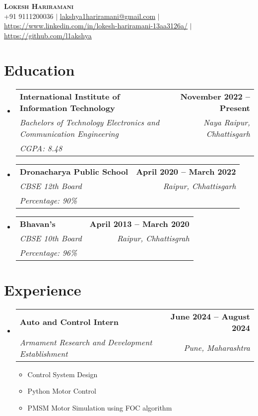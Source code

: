 \documentclass[letterpaper,11pt]{article}
\makeatletter
\newcommand{\resumeItem}[1]{
  \item\small{
    {#1 \vspace{-2pt}}
  }
}
\newcommand{\resumeEducation}[5]{
  \vspace{-2pt}\item
    \begin{tabular*}{\textwidth}{l@{\extracolsep{\fill}}r}
      \textbf{#1} & \textbf{#4} \\
      \textit{\small#3} & \textit{#2} \\
      \textit{#5} & \\
    \end{tabular*}\vspace{-7pt}
}
\newcommand{\resumeSubheading}[4]{
  \vspace{-2pt}\item
    \begin{tabular*}{\textwidth}{l@{\extracolsep{\fill}}r}
      \textbf{#1} & \textbf{#2} \\
      \textit{\small#3} & \textit{#4} \\
    \end{tabular*}\vspace{-7pt}
}
\newcommand{\resumeSubHeadingListStart}{\begin{itemize}[leftmargin=0.15in, label={}]}
\newcommand{\resumeSubHeadingListEnd}{\end{itemize}}
\newcommand{\resumeItemListStart}{\begin{itemize}}
\newcommand{\resumeItemListEnd}{\end{itemize}\vspace{-5pt}}
\makeatother
\begin{document}

\begin{center}
    \textbf{\Huge \scshape Lokesh Hariramani} \\ \vspace{1pt}
    \small +91 9111200036 $|$ \href{mailto:x@x.com}{\underline{lakshya1hariramani@gmail.com}} $|$ 
    \href{}{\underline{https://www.linkedin.com/in/lokesh-hariramani-13aa3126a/}} $|$
    \href{}{\underline{https://github.com/l1akshya}}
\end{center}

\section{Education}
\resumeSubHeadingListStart
    \resumeEducation
      {International Institute of Information Technology}
      {Naya Raipur, Chhattisgarh}
      {Bachelors of Technology Electronics and Communication Engineering}
      {November 2022 -- Present}
      {CGPA: 8.48}
    \resumeEducation
      {Dronacharya Public School}
      {Raipur, Chhattisgarh}
      {CBSE 12th Board}
      {April 2020 -- March 2022}
      {Percentage: 90\%}
    \resumeEducation
      {Bhavan's}
      {Raipur, Chhattisgrah}
      {CBSE 10th Board}
      {April  2013 -- March 2020}
      {Percentage: 96\%}
\resumeSubHeadingListEnd



\section{Experience}
\resumeSubHeadingListStart
    \resumeSubheading
      {Auto and Control Intern }{June 2024 -- August 2024}
      {Armament Research and Development Establishment}{Pune, Maharashtra}
      \resumeItemListStart
        \resumeItem{Control System Design}
        \resumeItem{Python Motor Control}
        \resumeItem{PMSM Motor Simulation using FOC algorithm}
      \resumeItemListEnd
\resumeSubHeadingListEnd
\end{document}
